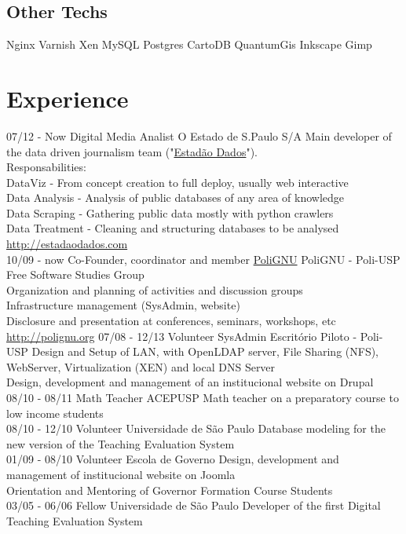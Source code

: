 \documentclass[]{friggeri-cv}
\begin{document}
\begin{aside}
  \section{Other Techs}
    Nginx
    Varnish
    Xen
    MySQL
    Postgres
    CartoDB
    QuantumGis
    Inkscape
    Gimp
\end{aside}

\section{Experience}
\begin{entrylist}
  \entry
    {07/12 - Now}
    {Digital Media Analist}
    {O Estado de S.Paulo S/A}
    {Main developer of the data driven journalism team ("\href{http://estadaodados.com}{Estadão Dados}").\\
     Responsabilities:\\
     DataViz - From concept creation to full deploy, usually web interactive\\
     Data Analysis - Analysis of public databases of any area of knowledge\\
     Data Scraping - Gathering public data mostly with python crawlers\\
     Data Treatment - Cleaning and structuring databases to be analysed\\
     \href{http://estadaodados.com}{http://estadaodados.com}\\}
  \entry
    {10/09 - now}
    {Co-Founder, coordinator and member}
    {\href{http://polignu.org}{PoliGNU}}
    {PoliGNU - Poli-USP Free Software Studies Group\\
    Organization and planning of activities and discussion groups\\
     Infrastructure management (SysAdmin, website)\\
     Disclosure and presentation at conferences, seminars, workshops, etc\\
     \href{http://polignu.org}{http://polignu.org}}
   \entry
    {07/08 - 12/13}
    {Volunteer SysAdmin}
    {Escritório Piloto - Poli-USP}
    {Design and Setup of LAN, with OpenLDAP server, File Sharing (NFS), WebServer, Virtualization (XEN) and local DNS Server\\
     Design, development and management of an institucional website on Drupal\\}
   \entry
    {08/10 - 08/11}
    {Math Teacher}
    {ACEPUSP}
    {Math teacher on a preparatory course to low income students\\}
   \entry
    {08/10 - 12/10}
    {Volunteer}
    {Universidade de São Paulo}
    {Database modeling for the new version of the Teaching Evaluation System\\}
   \entry
    {01/09 - 08/10}
    {Volunteer}
    {Escola de Governo}
    {Design, development and management of institucional website on Joomla\\
     Orientation and Mentoring of Governor Formation Course Students\\}
   \entry
    {03/05 - 06/06}
    {Fellow}
    {Universidade de São Paulo}
    {Developer of the first Digital Teaching Evaluation System}
\end{entrylist}
\end{document}
